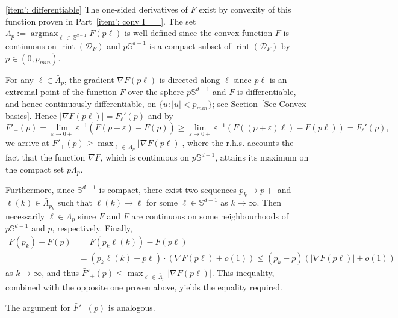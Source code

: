 \documentclass[10pt]{amsart}
\theoremstyle{definition}\newtheorem{defi}[theo]{Definition}\newtheorem{rema}[theo]{Remark}\newtheorem{exam}[theo]{Example}\newtheorem{exem}[theo]{Example}\newtheorem{nota}[theo]{Notation}
\DeclareMathOperator{\rint}{rint}
\newcommand{\Sbb}{\mathbb{S}}
\newcommand{\Dcl}{\mathcal{D}}
\newcommand{\argmax}{\mathop{\mathrm{argmax}}\nolimits}
\begin{document}
\begin{proofc}
\eqref{item': differentiable} The one-sided derivatives of $\bar F$ exist by convexity of this function proven in Part~\eqref{item': conv I_ =}. The set $\bar{\Lambda}_p:= \argmax_{\ell\,\in\,\Sbb^{d-1}} F(p \ell)$ is well-defined since the convex function $F$ is continuous on $\rint(\Dcl_F) $ and $p \Sbb^{d-1} $ is a compact subset of $\rint(\Dcl_F) $ by $p \in (0, p_{min})$.

For any $\ell \in \bar{\Lambda}_p$, the gradient $\nabla F(p \ell)$ is directed along $\ell$ since $p \ell$ is an extremal point of the function $F$ over the sphere $p \Sbb^{d-1}$ and $F$ is differentiable, and hence continuously differentiable, on $\{u: |u|<p_{min}\}$; see Section~\ref{Sec Convex basics}. Hence $|\nabla F(p \ell)| = F_\ell'(p)$ and by
\[
\bar F'_+(p) = \lim_{\varepsilon\to 0+} \varepsilon^{-1}(\bar F(p+\varepsilon)- \bar F(p)) \ge \lim_{\varepsilon\to 0+} \varepsilon^{-1}(F((p+\varepsilon)\ell)- F(p\ell)) = F_\ell'(p),
\]
we arrive at $\bar F'_+(p) \ge \max_{\ell\,\in\,\bar{\Lambda}_p} |\nabla F(p \ell)|$, where the r.h.s. accounts the fact that the function $\nabla F$, which is continuous on $p \Sbb^{d-1}$, attains its maximum on the compact set $p \bar{\Lambda}_p$.

Furthermore, since $\Sbb^{d-1}$ is compact, there exist two sequences $p_k \to p+$ and $\ell(k) \in \bar{\Lambda}_{p_k}$ such that $\ell(k) \to \ell$ for some $\ell \in \Sbb^{d-1}$ as $k \to \infty$. Then necessarily $\ell \in \bar{\Lambda}_p$ since $F$ and $\bar F$ are continuous on some neighbourhoods of $p \Sbb^{d-1}$ and $p$, respectively. Finally,
\begin{align*}
\bar F(p_k) - \bar F(p) &= F(p_k \ell(k)) - F(p \ell) \\
&= \left(p_k \ell(k) - p \ell\right) \cdot \left(\nabla F(p \ell) + o(1)\right) \le (p_k - p) \left(\left|\nabla F(p\ell)\right| + o(1)\right)
\end{align*}
as $k \to \infty$, and thus $\bar F'_+(p) \le \max_{\ell\,\in \,\bar{\Lambda}_p} |\nabla F(p \ell)|$. This inequality, combined with the opposite one proven above, yields the equality required.

The argument for $\bar F'_-(p)$ is analogous.


\end{proofc}
\end{document}
